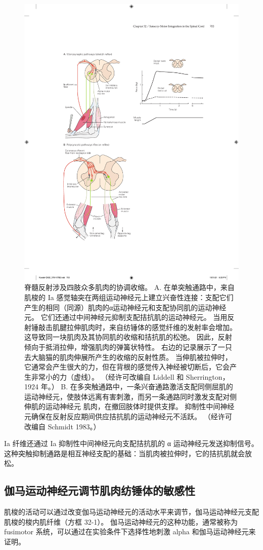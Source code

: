 \begin{figure}[htbp]
	\centering
	\includegraphics[width=0.75\linewidth]{chap32/fig_32_1}
	\caption{脊髓反射涉及四肢众多肌肉的协调收缩。
		A. 在单突触通路中，来自肌梭的 Ia 感觉轴突在两组运动神经元上建立兴奋性连接：支配它们产生的相同（同源）肌肉的α运动神经元和支配协同肌的运动神经元。 
		它们还通过中间神经元抑制支配拮抗肌的运动神经元。
		当用反射锤敲击肌腱拉伸肌肉时，来自纺锤体的感觉纤维的发射率会增加。
		这导致同一块肌肉及其协同肌的收缩和拮抗肌的松弛。
		因此，反射倾向于抵消拉伸，增强肌肉的弹簧状特性。
		右边的记录展示了一只去大脑猫的肌肉伸展所产生的收缩的反射性质。 当伸肌被拉伸时，它通常会产生很大的力，但在背根的感觉传入神经被切断后，它会产生非常小的力（虚线）。 （经许可改编自 Liddell 和 Sherrington，1924 年。）
		B. 在多突触通路中，一条兴奋通路激活支配同侧屈肌的运动神经元，使肢体远离有害刺激，而另一条通路同时激发支配对侧伸肌的运动神经元 肌肉，在撤回肢体时提供支撑。
		抑制性中间神经元确保在反射反应期间供应拮抗肌的运动神经元不活跃。 （经许可改编自 Schmidt 1983。）}
	\label{fig:32_1}
\end{figure}


Ia 纤维还通过 Ia 抑制性中间神经元向支配拮抗肌的 α 运动神经元发送抑制信号。
这种突触抑制通路是相互神经支配的基础：当肌肉被拉伸时，它的拮抗肌就会放松。



\subsection{伽马运动神经元调节肌肉纺锤体的敏感性}
肌梭的活动可以通过改变伽马运动神经元的活动水平来调节，伽马运动神经元支配肌梭的梭内肌纤维（方框 32-1）。
伽马运动神经元的这种功能，通常被称为 fusimotor 系统，可以通过在实验条件下选择性地刺激 alpha 和伽马运动神经元来证明。


